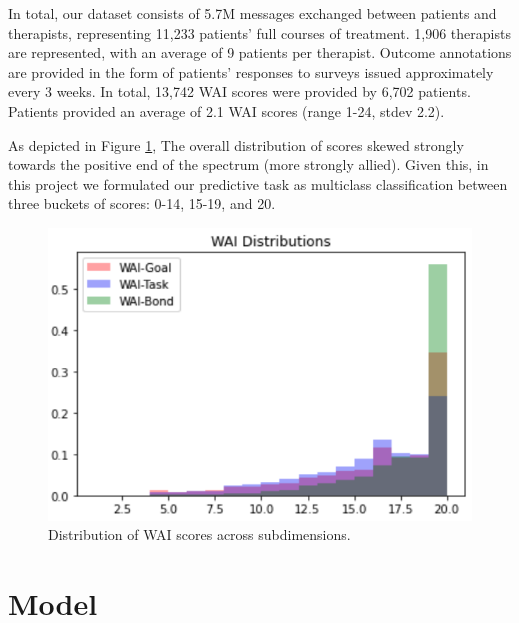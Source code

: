 \documentclass{article}
\begin{document}
In total, our dataset consists of 5.7M messages exchanged between patients and therapists, representing 11,233 patients' full courses of treatment. 1,906 therapists are represented, with an average of 9 patients per therapist. Outcome annotations are provided in the form of patients' responses to surveys issued approximately every 3 weeks. In total, 13,742 WAI scores were provided by 6,702 patients. Patients provided an average of 2.1 WAI scores (range 1-24, stdev 2.2). 

As depicted in Figure \ref{fig:wai-distribution}, The overall distribution of scores skewed strongly towards the positive end of the spectrum (more strongly allied). Given this, in this project we formulated our predictive task as multiclass classification between three buckets of scores: 0-14, 15-19, and 20.

\begin{figure}
  \includegraphics[width=\columnwidth]{figs/wai-distribution.png}
  \caption{Distribution of WAI scores across subdimensions.}
  \label{fig:wai-distribution}
\end{figure}


\section{Model}
\label{sec:model}

\end{document}
